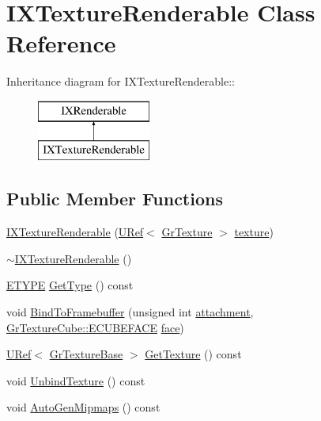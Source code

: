 \hypertarget{class_i_x_texture_renderable}{
\section{IXTextureRenderable Class Reference}
\label{class_i_x_texture_renderable}
}
Inheritance diagram for IXTextureRenderable::\begin{figure}[H]
\begin{center}
\leavevmode
\includegraphics[height=2cm]{class_i_x_texture_renderable}
\end{center}
\end{figure}
\subsection*{Public Member Functions}
\begin{CompactItemize}
\item 
\hyperlink{class_i_x_texture_renderable_36bd2cf25c36fadfc244c0fe016664f2}{IXTextureRenderable} (\hyperlink{class_u_ref}{URef}$<$ \hyperlink{class_gr_texture}{GrTexture} $>$ \hyperlink{glext__bak_8h_8f486379aef534669f4f06f515e7ce6c}{texture})
\item 
\hyperlink{class_i_x_texture_renderable_636040ae8fb29015517c25b71d2a2d02}{$\sim$IXTextureRenderable} ()
\item 
\hyperlink{class_i_x_renderable_a83cb64592404acfb99afbc55a4ed8a8}{ETYPE} \hyperlink{class_i_x_texture_renderable_51527120351185e79124254a61616fdb}{GetType} () const 
\item 
void \hyperlink{class_i_x_texture_renderable_79cbe96edff769e27c5dbbcb1defdd2d}{BindToFramebuffer} (unsigned int \hyperlink{glext__bak_8h_d8f97111cc6514af5f352219d1cceb40}{attachment}, \hyperlink{class_gr_texture_cube_49c6f83c73520edfce04f4eb5dcfe6a0}{GrTextureCube::ECUBEFACE} \hyperlink{glext_8h_676ca580c460c0154eb58200433d2a9e}{face})
\item 
\hyperlink{class_u_ref}{URef}$<$ \hyperlink{class_gr_texture_base}{GrTextureBase} $>$ \hyperlink{class_i_x_texture_renderable_360a1f72f8781be9af2d9616b006ee31}{GetTexture} () const 
\item 
void \hyperlink{class_i_x_texture_renderable_6cf2f52580c043bdf381d1a6e13c09e9}{UnbindTexture} () const 
\item 
void \hyperlink{class_i_x_texture_renderable_192d19327613117b701f34a46025d028}{AutoGenMipmaps} () const 
\end{CompactItemize}



